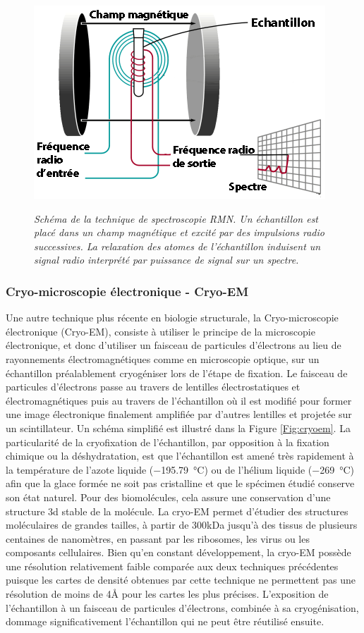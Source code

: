 \begin{figure}
  \centering
  {\includegraphics[width=0.7\linewidth]{./figures/ch1/rmn.png}}
    \caption{\it Schéma de la technique de spectroscopie RMN. Un échantillon est placé dans un champ magnétique et excité par des impulsions radio successives. La relaxation des atomes de l'échantillon induisent un signal radio interprété par puissance de signal sur un spectre.}
    \label{Fig:rmn}
  \hspace{0.3cm}
\end{figure}

\subsubsection{Cryo-microscopie électronique - Cryo-EM}


Une autre technique plus récente en biologie structurale, la Cryo-microscopie électronique (Cryo-EM), consiste à utiliser le principe de la microscopie électronique, et donc d'utiliser un faisceau de particules d'électrons au lieu de rayonnements électromagnétiques comme en microscopie optique, sur un échantillon préalablement cryogéniser lors de l'étape de fixation. Le faisceau de particules d'électrons passe au travers de lentilles électrostatiques et électromagnétiques puis au travers de l'échantillon où il est modifié pour former une image électronique finalement amplifiée par d'autres lentilles et projetée sur un scintillateur. Un schéma simplifié est illustré dans la Figure \ref{Fig:cryoem}.
La particularité de la cryofixation de l'échantillon, par opposition à la fixation chimique ou la déshydratation, est que l'échantillon est amené très rapidement à la température de l'azote liquide (\SI{-195.79}{\degreeCelsius}) ou de l'hélium liquide (\SI{-269}{\degreeCelsius}) afin que la glace formée ne soit pas cristalline et que le spécimen étudié conserve son état naturel. Pour des biomolécules, cela assure une conservation d'une structure 3d stable de la molécule. La cryo-EM permet d'étudier des structures moléculaires de grandes tailles, à partir de 300kDa jusqu'à des tissus de plusieurs centaines de nanomètres, en passant par les ribosomes, les virus ou les composants cellulaires.
Bien qu'en constant développement, la cryo-EM possède une résolution relativement faible comparée aux deux techniques précédentes puisque les cartes de densité obtenues par cette technique ne permettent pas une résolution de moins de 4\r{A} pour les cartes les plus précises\cite{zhou_atomic_2011}. L'exposition de l'échantillon à un faisceau de particules d'électrons, combinée à sa cryogénisation, dommage significativement l'échantillon qui ne peut être réutilisé ensuite.

